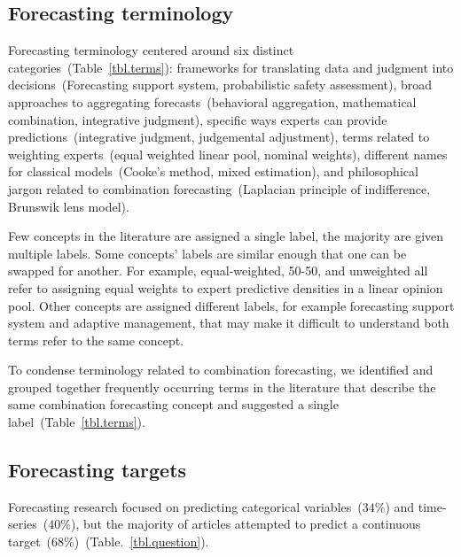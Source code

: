 \documentclass[preprint,authoryear,nonatbib]{elsarticle}
\begin{document}
\subsection{Forecasting terminology}

Forecasting terminology centered around six distinct categories~(Table~\ref{tbl.terms}): frameworks for translating data and judgment into decisions~(Forecasting support system, probabilistic safety assessment), broad approaches to aggregating forecasts~(behavioral aggregation, mathematical combination, integrative judgment), specific ways experts can provide predictions~(integrative judgment, judgemental adjustment), terms related to weighting experts~(equal weighted linear pool, nominal weights), different names for classical models~(Cooke's method, mixed estimation), and philosophical jargon related to combination forecasting~(Laplacian principle of indifference, Brunswik lens model). 

Few concepts in the literature are assigned a single label, the majority are given multiple labels.
Some concepts' labels are similar enough that one can be swapped for another.
For example, equal-weighted, 50-50, and unweighted all refer to assigning equal weights to expert predictive densities in a linear opinion pool. 
Other concepts are assigned different labels, for example forecasting support system and adaptive management, that may make it difficult to understand both terms refer to the same concept.

To condense terminology related to combination forecasting, we identified and grouped together frequently occurring terms in the literature that describe the same combination forecasting concept and suggested a single label~(Table~\ref{tbl.terms}).

\subsection{Forecasting targets}

Forecasting research focused on predicting categorical variables~($34$\%) and time-series~($40$\%), but
the majority of articles attempted to predict a continuous target~($68$\%)~(Table.~\ref{tbl.question}).
\end{document}
